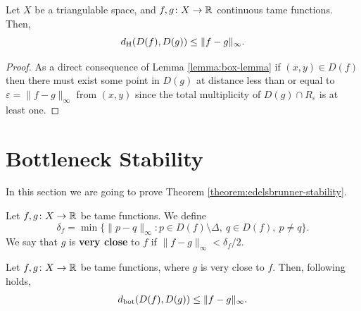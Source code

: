 \begin{theorem} \label{theorem:hausdorff-stability}
    Let $ X $ be a triangulable space, and $ f, g\colon X \to \mathbb R $ continuous tame functions. Then,
    \begin{equation}
        d_{\operatorname{H}}(D(f), D(g)) \leq \| f - g \|_\infty.
    \end{equation}
\end{theorem}
\begin{proof}
    As a direct consequence of Lemma \ref{lemma:box-lemma} if $ (x, y)\in D(f) $ then there must exist some point in $ D(g) $ at distance less than or equal to $ \varepsilon =  \| f - g \|_\infty $ from $(x, y) $ since the total multiplicity of $ D(g) \cap R_\varepsilon $ is at least one.
\end{proof}

\section{Bottleneck Stability} \label{sec:bot-stability}
In this section we are going to prove Theorem \ref{theorem:edelsbrunner-stability}. 

\Main*

\begin{definition}
    Let $ f, g \colon X \to \mathbb R $ be tame functions. We define
    $$
        \delta_f = \min \{ \|p - q\|_\infty : p \in D(f) \setminus \Delta, \ q \in D(f), \ p \neq q\}.
    $$
    We say that $ g $ is {\bf very close} to $ f $ if $\|f-g\|_\infty < \delta_f / 2$.
\end{definition}

\begin{lemma} \label{lemma:easy-biyection}
    Let $ f, g \colon X \to \mathbb R $ be tame functions, where $ g $ is very close to $ f $. Then, following holds,
    \begin{align}
        d_{\operatorname{bot}}(D(f), D(g)) \leq \|f - g \|_\infty.
    \end{align}
\end{lemma}

